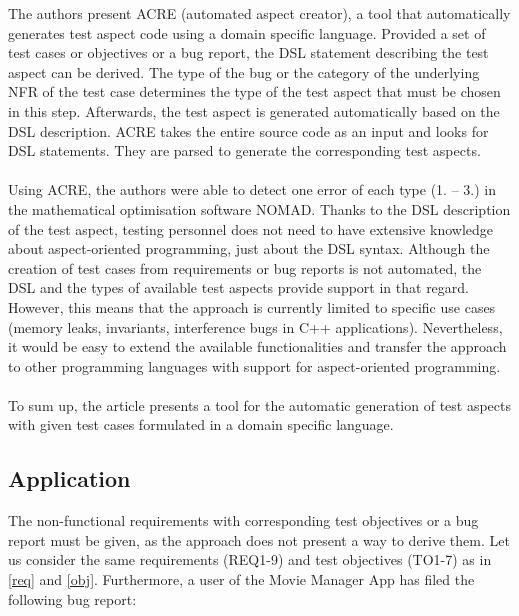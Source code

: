 The authors present ACRE (automated aspect creator), a tool that automatically generates test aspect code using a domain specific language. Provided a set of test cases or objectives or a bug report, the DSL statement describing the test aspect can be derived. The type of the bug or the category of the underlying NFR of the test case determines the type of the test aspect that must be chosen in this step. Afterwards, the test aspect is generated automatically based on the DSL description. ACRE takes the entire source code as an input and looks for DSL statements. They are parsed to generate the corresponding test aspects.\\
\\
Using ACRE, the authors were able to detect one error of each type (1. – 3.) in the mathematical optimisation software NOMAD. Thanks to the DSL description of the test aspect, testing personnel does not need to have extensive knowledge about aspect-oriented programming, just about the DSL syntax. Although the creation of test cases from requirements or bug reports is not automated, the DSL and the types of available test aspects provide support in that regard. However, this means that the approach is currently limited to specific use cases (memory leaks, invariants, interference bugs in C++ applications). Nevertheless, it would be easy to extend the available functionalities and transfer the approach to other programming languages with support for aspect-oriented programming. \\
\\
To sum up, the article presents a tool for the automatic generation of test aspects with given test cases formulated in a domain specific language.

\newpage
\subsection{Application}
The non-functional requirements with corresponding test objectives or a bug report must be given, as the approach does not present a way to derive them. Let us consider the same requirements (REQ1-9) and test objectives (TO1-7) as in \autoref{req} and \autoref{obj}. Furthermore, a user of the Movie Manager App has filed the following bug report:

